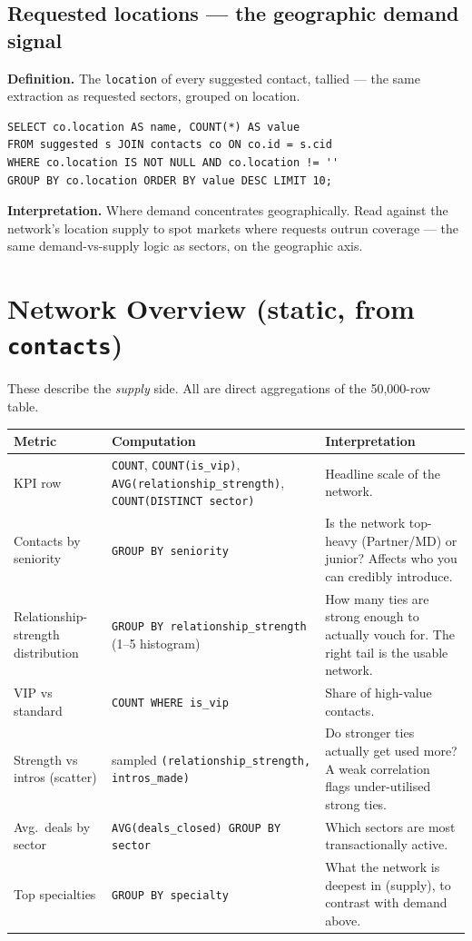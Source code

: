 \documentclass[11pt, a4paper]{article}
\begin{document}
\subsection{Requested locations --- the geographic demand signal}
\textbf{Definition.} The \texttt{location} of every suggested contact, tallied --- the same extraction as requested sectors, grouped on location.
\begin{lstlisting}[style=sql]
SELECT co.location AS name, COUNT(*) AS value
FROM suggested s JOIN contacts co ON co.id = s.cid
WHERE co.location IS NOT NULL AND co.location != ''
GROUP BY co.location ORDER BY value DESC LIMIT 10;
\end{lstlisting}
\textbf{Interpretation.} Where demand concentrates geographically. Read against the network's location supply to spot markets where requests outrun coverage --- the same demand-vs-supply logic as sectors, on the geographic axis.

\section{Network Overview (static, from \texttt{contacts})}

These describe the \emph{supply} side. All are direct aggregations of the 50{,}000-row table.

\begin{longtable}{@{}p{4.2cm}p{5.2cm}p{5.6cm}@{}}
\toprule
Metric & Computation & Interpretation \\
\midrule
\endhead
KPI row & \texttt{COUNT}, \texttt{COUNT(is\_vip)}, \texttt{AVG(relationship\_strength)}, \texttt{COUNT(DISTINCT sector)} & Headline scale of the network. \\
Contacts by seniority & \texttt{GROUP BY seniority} & Is the network top-heavy (Partner/MD) or junior? Affects who you can credibly introduce. \\
Relationship-strength distribution & \texttt{GROUP BY relationship\_strength} (1--5 histogram) & How many ties are strong enough to actually vouch for. The right tail is the usable network. \\
VIP vs standard & \texttt{COUNT WHERE is\_vip} & Share of high-value contacts. \\
Strength vs intros (scatter) & sampled \texttt{(relationship\_strength, intros\_made)} & Do stronger ties actually get used more? A weak correlation flags under-utilised strong ties. \\
Avg.\ deals by sector & \texttt{AVG(deals\_closed) GROUP BY sector} & Which sectors are most transactionally active. \\
Top specialties & \texttt{GROUP BY specialty} & What the network is deepest in (supply), to contrast with demand above. \\
\bottomrule
\end{longtable}
\end{document}
